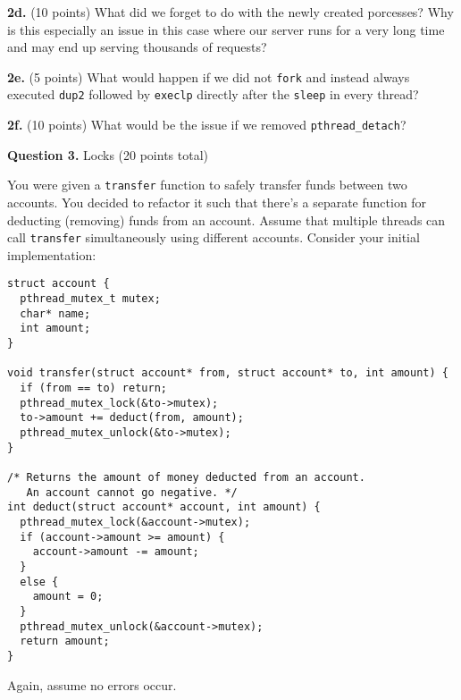 \documentclass[12pt]{article}
\begin{document}
\vspace{3em}

\textbf{2d.} (10 points)
What did we forget to do with the newly created porcesses?
Why is this especially an issue in this case where our server runs for a very
long time and may end up serving thousands of requests?

\vspace{16em}

\textbf{2e.} (5 points)
What would happen if we did not \texttt{fork} and instead always executed
\texttt{dup2} followed by \texttt{execlp} directly after the \texttt{sleep} in
every thread?

\vspace{11em}

\textbf{2f.} (10 points)
What would be the issue if we removed \texttt{pthread\_detach}?

\newpage

\textbf{Question 3.} Locks (20 points total)

\vspace{1em}

You were given a \texttt{transfer} function to safely transfer funds between two
accounts.
You decided to refactor it such that there's a separate function for deducting
(removing) funds from an account.
Assume that multiple threads can call \texttt{transfer} simultaneously
using different accounts.
Consider your initial implementation:

\vspace{1em}

\begin{lstlisting}
struct account {
  pthread_mutex_t mutex;
  char* name;
  int amount;
}

void transfer(struct account* from, struct account* to, int amount) {
  if (from == to) return;
  pthread_mutex_lock(&to->mutex);
  to->amount += deduct(from, amount);
  pthread_mutex_unlock(&to->mutex);
}

/* Returns the amount of money deducted from an account.
   An account cannot go negative. */
int deduct(struct account* account, int amount) {
  pthread_mutex_lock(&account->mutex);
  if (account->amount >= amount) {
    account->amount -= amount;
  }
  else {
    amount = 0;
  }
  pthread_mutex_unlock(&account->mutex);
  return amount;
}
\end{lstlisting}

\vspace{1em}

Again, assume no errors occur.
\end{document}
